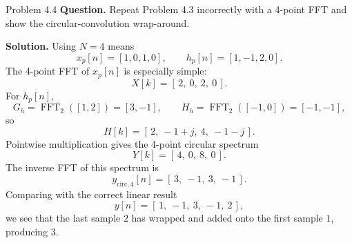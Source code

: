 \documentclass[10pt]{article}
\newcommand{\Prompt}[1]{\textbf{Question.} #1}
\newcommand{\SketchLabel}{\tcblower\textbf{Solution.}}
\begin{document}
\newpage

\begin{examplebox}{Problem 4.4}
  \Prompt{Repeat Problem 4.3 incorrectly with a 4-point FFT and show the circular-convolution wrap-around.}

  \medskip
  \SketchLabel{}
  Using \(N=4\) means
  \[
    x_p[n]=[1,0,1,0],\qquad h_p[n]=[1,-1,2,0].
  \]
  The 4-point FFT of \(x_p[n]\) is especially simple:
  \[
    X[k]=[\,2,\ 0,\ 2,\ 0\,].
  \]
  For \(h_p[n]\),
  \[
    G_h=\operatorname{FFT}_2([1,2])=[3,-1],\qquad H_h=\operatorname{FFT}_2([-1,0])=[-1,-1],
  \]
  so
  \[
    H[k]=[\,2,\ -1+j,\ 4,\ -1-j\,].
  \]
  Pointwise multiplication gives the 4-point circular spectrum
  \[
    Y[k]=[\,4,\ 0,\ 8,\ 0\,].
  \]
  The inverse FFT of this spectrum is
  \[
    y_{\mathrm{circ},4}[n]=[\,3,\ -1,\ 3,\ -1\,].
  \]
  Comparing with the correct linear result
  \[
    y[n]=[\,1,\ -1,\ 3,\ -1,\ 2\,],
  \]
  we see that the last sample \(2\) has wrapped and added onto the first sample \(1\), producing \(3\).


\end{examplebox}
\end{document}
